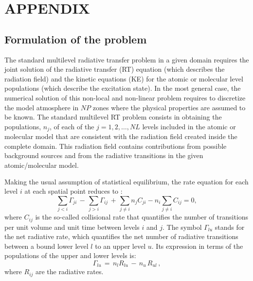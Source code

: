 \documentclass[12pt]{article}
\begin{document}

\newpage
\appendix

\section{APPENDIX}

\subsection{Formulation of the problem}

The standard multilevel radiative transfer problem in a given domain requires
the joint solution of the radiative transfer (RT) equation (which describes the
radiation field) and the kinetic equations (KE) for the atomic or molecular
level populations (which describe the excitation state). In the most general
case, the numerical solution of this non-local and non-linear problem requires
to discretize the model atmosphere in $NP$ zones where the physical properties
are assumed to be known. The standard multilevel RT problem consists in
obtaining the populations, $n_j$, of each of the $j=1,2,\ldots,NL$ levels
included in the atomic or molecular model that are consistent with the
radiation field created inside the complete domain. This radiation field
contains contributions from possible background sources and from the radiative
transitions in the given atomic/molecular model.

Making the usual assumption of statistical equilibrium, the rate equation for each
level $i$ at each spatial point reduces to \citep[e.g.,][]{socas_trujillo97}:
\begin{equation}
\label{eq:statis_equil_eq}
\sum_{j < i}{\Gamma}_{ji}\,-\,\sum_{j > i}{\Gamma}_{ij}\,
+\,\sum_{j \neq i}{n_j C_{ji}} - n_i \sum_{j \neq i}{C_{ij}} = 0,
\end{equation}
where $C_{ij}$ is the so-called collisional rate that quantifies the number of
transitions per unit volume and unit time between levels $i$ and $j$. The symbol
$\Gamma_{lu}$ stands for the net radiative rate, which quantifies the net number of
radiative transitions between a bound lower level $l$ to an upper level $u$. Its
expression in terms of the populations of the upper and lower levels is:
\begin{equation}
\label{eq:net_rad_rate}
\Gamma_{lu}\,=\,n_l R_{lu}\,-\,n_u\,R_{ul}\, ,
\end{equation}
where $R_{ij}$ are the radiative rates.
\end{document}
